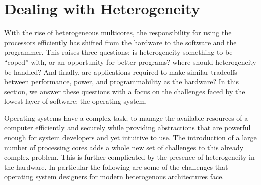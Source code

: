 \section{Dealing with Heterogeneity}

With the rise of heterogeneous multicores, the responsibility
for using the processors efficiently has shifted from the hardware
to the software and the programmer. This raises three questions:
is heterogeneity something to be ``coped'' with, or an opportunity for
better programs? where should heterogeneity be handled? And finally,
are applications required to make similar tradeoffs between
performance, power, and programmability as the hardware?
In this section, we answer these questions with a focus on the
challenges faced by the lowest layer of software: the operating system.

Operating systems have a complex task; to manage the available
resources of a computer efficiently and securely while providing abstractions
that are powerful enough for system developers and yet intuitive to use. The
introduction of a large number of processing cores adds a whole new set of
challenges to this already complex problem. This is further complicated
by the presence of heterogeneity in the hardware. In particular the following
are some of the challenges that operating system designers for modern heterogenous
architectures face.

